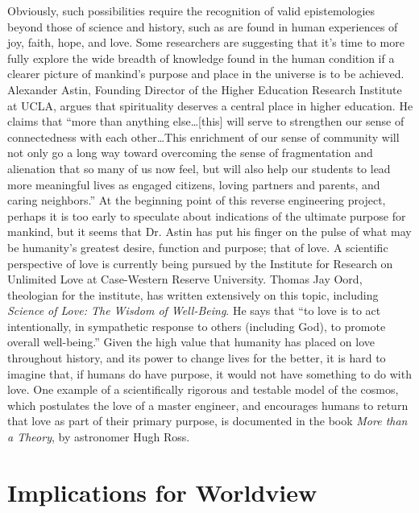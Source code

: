 Obviously, such possibilities require the recognition of valid
epistemologies beyond those of science and history, such as are found
in human experiences of joy, faith, hope, and love. Some researchers
are suggesting that it’s time to more fully explore the wide breadth of
knowledge found in the human condition if a clearer picture of
mankind’s purpose and place in the universe is to be achieved.
Alexander Astin, Founding Director of the Higher Education Research
Institute at UCLA, argues that spirituality deserves a central place in
higher education.\citep{astin2004} He claims that ``more than
anything else{\ldots}[this] will serve to strengthen our sense of
connectedness with each other{\ldots}This enrichment of our sense of community
will not only go a long way toward overcoming the sense of
fragmentation and alienation that so many of us now feel, but will also
help our students to lead more meaningful lives as engaged citizens,
loving partners and parents, and caring neighbors.'' At the beginning
point of this reverse engineering project, perhaps it is too early to
speculate about indications of the ultimate purpose for mankind, but it
seems that Dr. Astin has put his finger on the pulse of what may be
humanity’s greatest desire, function and purpose; that of love. A
scientific perspective of love is currently being pursued by the
Institute for Research on Unlimited Love at Case-Western Reserve
University. Thomas Jay Oord, theologian for the institute, has written
extensively on this topic, including \textit{Science of Love: The
Wisdom of Well-Being}.\citep{oord2004} He says that
“to love is to act intentionally, in
sympathetic response to others (including God), to promote overall
well-being.” Given the high value that humanity has placed on love
throughout history, and its power to change lives for the better, it is
hard to imagine that, if humans do have purpose, it would not have
something to do with love. One example of a scientifically rigorous and
testable model of the cosmos, which postulates the love of a master
engineer, and encourages humans to return that love as part of their
primary purpose, is documented in the book
\textit{More than a Theory},\citep{ross2009}
by astronomer Hugh Ross.

\section{Implications for Worldview}

